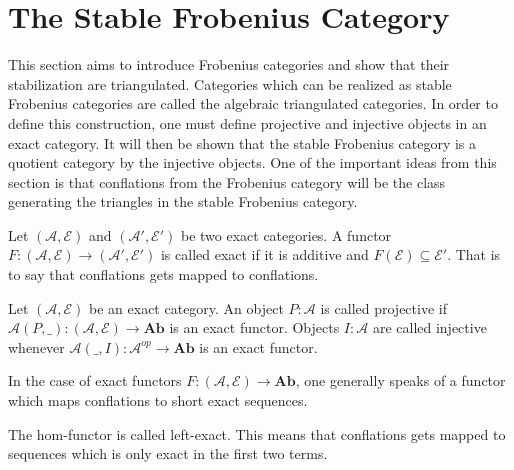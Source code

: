 \section{The Stable Frobenius Category}

    This section aims to introduce Frobenius categories and show that their stabilization are triangulated. Categories which can be realized as stable Frobenius categories are called the algebraic triangulated categories. In order to define this construction, one must define projective and injective objects in an exact category. It will then be shown that the stable Frobenius category is a quotient category by the injective objects. One of the important ideas from this section is that conflations from the Frobenius category will be the class generating the triangles in the stable Frobenius category.

    \begin{definition}
        Let $(\mathcal{A},\mathcal{E})$ and $(\mathcal{A}',\mathcal{E}')$ be two exact categories. A functor $F:(\mathcal{A},\mathcal{E})\rightarrow (\mathcal{A}',\mathcal{E}')$ is called exact if it is additive and $F(\mathcal{E})\subseteq \mathcal{E}'$. That is to say that conflations gets mapped to conflations. %
    \end{definition}

    \begin{definition}
        Let $(\mathcal{A},\mathcal{E})$ be an exact category. An object $P:\mathcal{A}$ is called projective if $\mathcal{A}(P,\_):(\mathcal{A},\mathcal{E})\rightarrow \textbf{Ab}$ is an exact functor. Objects $I:\mathcal{A}$ are called injective whenever $\mathcal{A}(\_,I):\mathcal{A}^{op}\rightarrow\textbf{Ab}$ is an exact functor.
    \end{definition}

    \begin{remark}
        In the case of exact functors $F:(\mathcal{A},\mathcal{E})\rightarrow\textbf{Ab}$, one generally speaks of a functor which maps conflations to short exact sequences.
    \end{remark}

    \begin{remark}
        The hom-functor is called left-exact. This means that conflations gets mapped to sequences which is only exact in the first two terms.
    \end{remark}

